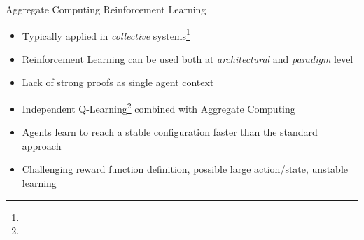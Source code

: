 \begin{frame}{Aggregate Computing \faPlus[left] Reinforcement Learning}
  \begin{cardTiny}
    \begin{itemize}
      \item Typically applied in \textit{collective} systems\footnote[frame]{}
      \item Reinforcement Learning can be used both at \textit{architectural} and \textit{paradigm} level
      \item [\failure{\faThumbsDown}] Lack of strong proofs as single agent context
    \end{itemize}
  \end{cardTiny}
  \begin{card}
    \begin{itemize}  
      \item Independent Q-Learning\footnote[frame]{} combined with Aggregate Computing
      \item Agents learn to reach a stable configuration faster than the standard approach
      \item[\failure{\faThumbsDown}] Challenging reward function definition, possible large action/state, unstable learning
    \end{itemize}
  \end{card}
\end{frame}